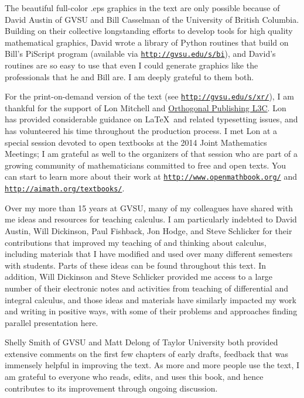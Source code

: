 The beautiful full-color .eps graphics in the text are only possible because of David Austin of GVSU and Bill Casselman of the University of British Columbia.  Building on their collective longstanding efforts to develop tools for high quality mathematical graphics, David wrote a library of Python routines that build on Bill's PiScript program (available via \href{http://gvsu.edu/s/bi}{\texttt{http://gvsu.edu/s/bi}}), and David's routines are so easy to use that even I could generate graphics like the professionals that he and Bill are.  I am deeply grateful to them both.

For the print-on-demand version of the text (see \href{http://gvsu.edu/s/xr/}{\texttt{http://gvsu.edu/s/xr/}}), I am thankful for the support of Lon Mitchell and \href{http://orthogonalpublishing.com/}{Orthogonal Publishing L3C}.  Lon has provided considerable guidance on \LaTeX~and related typesetting issues, and has volunteered his time throughout the production process.  I met Lon at a special session devoted to open textbooks at the 2014 Joint Mathematics Meetings; I am grateful as well to the organizers of that session who are part of a growing community of mathematicians committed to free and open texts.  You can start to learn more about their work at \href{http://www.openmathbook.org/}{\texttt{http://www.openmathbook.org/}} and \href{http://aimath.org/textbooks/}{\texttt{http://aimath.org/textbooks/}}.

Over my more than 15 years at GVSU, many of my colleagues have shared with me ideas and resources for teaching calculus.  I am particularly indebted to David Austin, Will Dickinson, Paul Fishback, Jon Hodge, and Steve Schlicker for their contributions that improved my teaching of and thinking about calculus, including materials that I have modified and used over many different semesters with students.  Parts of these ideas can be found throughout this text.  In addition, Will Dickinson and Steve Schlicker provided me access to a large number of their electronic notes and activities from teaching of differential and integral calculus, and those ideas and materials have similarly impacted my work and writing in positive ways, with some of their problems and approaches finding parallel presentation here.  

Shelly Smith of GVSU and Matt Delong of Taylor University both provided extensive comments on the first few chapters of early drafts, feedback that was immensely helpful in improving the text.  As more and more people use the text, I am grateful to everyone who reads, edits, and uses this book, and hence contributes to its improvement through ongoing discussion. 

